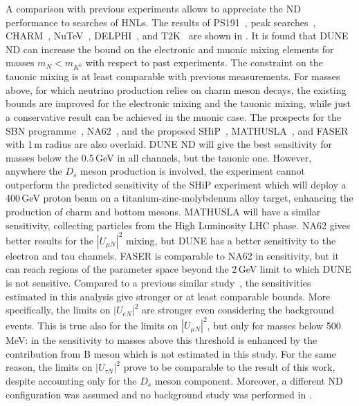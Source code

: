 A comparison with previous experiments allows to appreciate the ND performance to searches of HNLs.
The results of PS191~\cite{Bernardi:1985ny, Bernardi:1987ek}, peak searches~\cite{Artamonov:2014urb, Britton:1992pg, Britton:1992xv}, %
CHARM~\cite{Vilain:1994vg}, NuTeV~\cite{Vaitaitis:1999wq}, DELPHI~\cite{Abreu:1996pa}, and T2K~\cite{Abe:2019kgx} are shown %
in .
It is found that DUNE ND can increase the bound on the electronic and muonic mixing elements %
for masses $m_N < m_{K^0}$ with respect to past experiments.
The constraint on the tauonic mixing is at least comparable with previous measurements.
For masses above, for which neutrino production relies on charm meson decays, the existing bounds %
are improved for the electronic mixing and the tauonic mixing, while just a conservative result %
can be achieved in the muonic case.
The prospects for the SBN programme~\cite{Ballett:2016opr}, %
NA62~\cite{Drewes:2018irr}, and the proposed SHiP~\cite{Alekhin:2015byh}, MATHUSLA~\cite{Curtin:2018mvb}, %
and FASER~\cite{Kling:2018wct} with 1\,m radius are also overlaid.
DUNE ND will give the best sensitivity for masses below the 0.5\,GeV in all channels, but the tauonic one.
However, anywhere the $D_s$ meson production is involved, the experiment cannot outperform the predicted %
sensitivity of the SHiP experiment which will deploy a 400\,GeV proton beam on a titanium-zinc-molybdenum alloy %
target, enhancing the production of charm and bottom mesons.
MATHUSLA will have a similar sensitivity, collecting particles from the High Luminosity LHC phase.
NA62 gives better results for the $|U_{\mu N}|^2$ mixing, but DUNE has a better sensitivity %
to the electron and tau channels.
FASER is comparable to NA62 in sensitivity, but it can reach regions of the parameter space beyond the 2\,GeV limit %
to which DUNE is not sensitive.
Compared to a previous similar study~\cite{Krasnov:2019kdc}, %
the sensitivities estimated in this analysis give stronger or at least comparable bounds.
More specifically, the limits on $|U_{eN}|^2$ are stronger even considering the background events.
This is true also for the limits on $|U_{\mu N}|^2$, but only for masses below 500 MeV: %
in  the sensitivity to masses above this threshold is enhanced by the contribution %
from B meson which is not estimated in this study.
For the same reason, the limits on $|U_{\tau N}|^2$ prove to be comparable to the result of this work, %
despite accounting only for the $D_s$ meson component.
Moreover, a different ND configuration was assumed and no background study was performed in .

